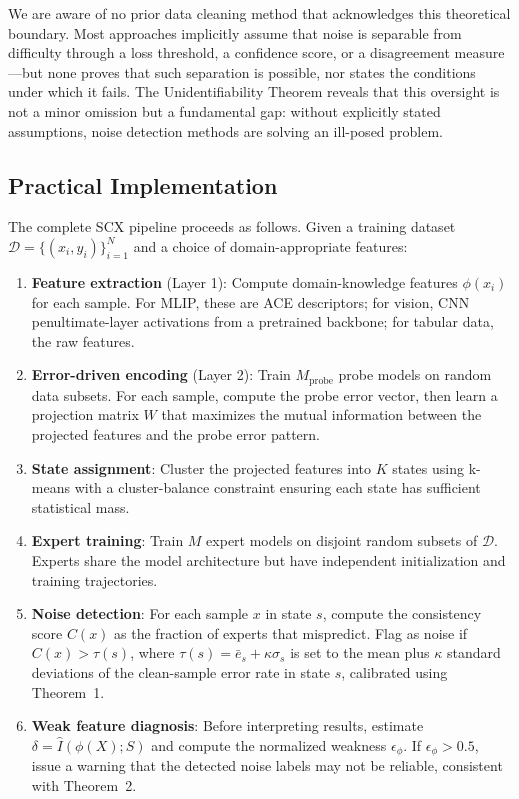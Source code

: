 We are aware of no prior data cleaning method that acknowledges this theoretical boundary. Most approaches implicitly assume that noise is separable from difficulty through a loss threshold, a confidence score, or a disagreement measure---but none proves that such separation is possible, nor states the conditions under which it fails. The Unidentifiability Theorem reveals that this oversight is not a minor omission but a fundamental gap: without explicitly stated assumptions, noise detection methods are solving an ill-posed problem.

\subsection{Practical Implementation}
\label{sec:implementation}

The complete SCX pipeline proceeds as follows. Given a training dataset $\mathcal{D} = \{(x_i, y_i)\}_{i=1}^N$ and a choice of domain-appropriate features:

\begin{enumerate}
    \item \textbf{Feature extraction} (Layer 1): Compute domain-knowledge features $\phi(x_i)$ for each sample. For MLIP, these are ACE descriptors; for vision, CNN penultimate-layer activations from a pretrained backbone; for tabular data, the raw features.
    \item \textbf{Error-driven encoding} (Layer 2): Train $M_{\mathrm{probe}}$ probe models on random data subsets. For each sample, compute the probe error vector, then learn a projection matrix $W$ that maximizes the mutual information between the projected features and the probe error pattern.
    \item \textbf{State assignment}: Cluster the projected features into $K$ states using k-means with a cluster-balance constraint ensuring each state has sufficient statistical mass.
    \item \textbf{Expert training}: Train $M$ expert models on disjoint random subsets of $\mathcal{D}$. Experts share the model architecture but have independent initialization and training trajectories.
    \item \textbf{Noise detection}: For each sample $x$ in state $s$, compute the consistency score $C(x)$ as the fraction of experts that mispredict. Flag as noise if $C(x) > \tau(s)$, where $\tau(s) = \bar{e}_s + \kappa \sigma_s$ is set to the mean plus $\kappa$ standard deviations of the clean-sample error rate in state $s$, calibrated using Theorem~1.
    \item \textbf{Weak feature diagnosis}: Before interpreting results, estimate $\delta = \hat{I}(\phi(X); S)$ and compute the normalized weakness $\epsilon_\phi$. If $\epsilon_\phi > 0.5$, issue a warning that the detected noise labels may not be reliable, consistent with Theorem~2.
\end{enumerate}

